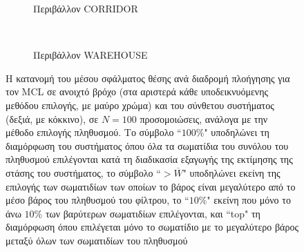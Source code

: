 \begin{figure}
  \vspace{2cm}
  \begin{subfigure}{\linewidth}
  \hspace{-1.25cm}
    
    \vspace{0.3cm}
    \caption{\small Περιβάλλον CORRIDOR}
    \label{}
  \end{subfigure}\\
  \begin{subfigure}{\linewidth}\vspace{0.5cm}
    \hspace{-1.25cm}
    
    \vspace{0.3cm}
    \caption{\small Περιβάλλον WAREHOUSE}
    \label{}
    \end{subfigure}
\caption{\small Η κατανομή του μέσου σφάλματος θέσης ανά διαδρομή πλοήγησης
         για τον MCL σε ανοιχτό βρόχο (στα αριστερά κάθε υποδεικνυόμενης
         μεθόδου επιλογής, με μαύρο χρώμα) και του σύνθετου συστήματος (δεξιά,
         με κόκκινο), σε $N=100$ προσομοιώσεις, ανάλογα με την μέθοδο επιλογής
         πληθυσμού. Το σύμβολο ``$100\%$" υποδηλώνει τη διαμόρφωση του
         συστήματος όπου όλα τα σωματίδια του συνόλου του πληθυσμού επιλέγονται
         κατά τη διαδικασία εξαγωγής της εκτίμησης της στάσης του συστήματος,
         το σύμβολο ``$>\overline{W}$" υποδηλώνει εκείνη της επιλογής των
         σωματιδίων των οποίων το βάρος είναι μεγαλύτερο από το μέσο βάρος του
         πληθυσμού του φίλτρου, το ``$10\%$" εκείνη που μόνο το άνω $10\%$ των
         βαρύτερων σωματιδίων επιλέγονται, και ``top" τη διαμόρφωση όπου
         επιλέγεται μόνο το σωματίδιο με το μεγαλύτερο βάρος μεταξύ όλων των
         σωματιδίων του πληθυσμού}
\label{fig:02_02_04:selections_position_zoomed}
\end{figure}
